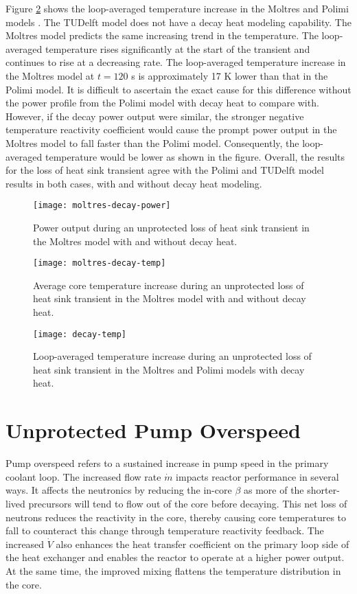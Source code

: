 Figure \ref{fig:polimidecaytemp} shows the loop-averaged temperature
increase in the Moltres and Polimi models \cite{fiorina_modelling_2014}. The
TUDelft model does not have a decay heat modeling capability. The Moltres
model predicts the same increasing trend in the temperature. The loop-averaged
temperature rises significantly at the start of the transient and continues to
rise at a decreasing rate. The loop-averaged temperature increase in the
Moltres model at $t=120$ s is approximately 17 K lower than that in the Polimi
model. It is difficult to ascertain the exact cause for this difference
without the power profile from the Polimi model with decay heat to compare
with. However, if the decay power output were similar, the stronger negative
temperature reactivity coefficient would cause the prompt power output in the
Moltres model to fall faster than the Polimi model. Consequently, the
loop-averaged temperature would be lower as shown in the figure. Overall, the
results for the loss of heat sink transient agree with the Polimi and TUDelft
model results in both cases, with and without decay heat modeling.

\begin{figure}[htbp!]
    \centering
    \texttt{[image: moltres-decay-power]}
    \caption{Power output during
    an unprotected loss of heat sink transient in the Moltres model with and
    without decay heat.}
    \label{fig:moltresdecaypower}
    \texttt{[image: moltres-decay-temp]}
    \caption{Average core temperature increase during
    an unprotected loss of heat sink transient in the Moltres model with and
    without decay heat.}
    \label{fig:moltresdecaytemp}
\end{figure}

\clearpage

\begin{figure}[htbp!]
    \centering
    \texttt{[image: decay-temp]}
    \caption{Loop-averaged temperature increase during
    an unprotected loss of heat sink transient in the Moltres and Polimi
    models \cite{fiorina_modelling_2014} with decay heat.}
    \label{fig:polimidecaytemp}
\end{figure}

\section{Unprotected Pump Overspeed}

Pump overspeed refers to a sustained
increase in pump speed in the primary coolant loop. The increased flow rate
$\dot{m}$ impacts reactor performance in several ways.
It affects the neutronics by reducing the in-core $\beta$ as more of the
shorter-lived precursors will tend to flow out of the core before decaying.
This net loss of neutrons reduces the reactivity in the core, thereby causing
core temperatures to fall to counteract this change through temperature
reactivity feedback. The increased $\dot{V}$ also enhances the heat transfer
coefficient on the primary loop side of the heat exchanger and enables the
reactor to operate at a higher power output. At the same time, the improved
mixing flattens the temperature distribution in the core.

